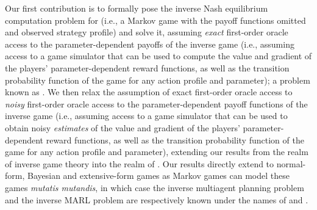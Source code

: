  
\fi

Our first contribution is to formally pose the inverse  Nash equilibrium computation problem for  (i.e., a Markov game with the payoff functions omitted and observed strategy profile) and solve it, assuming \emph{exact} first-order oracle access to the parameter-dependent payoffs of the inverse game (i.e., assuming access to a game simulator that can be used to compute the value and gradient of the players' parameter-dependent reward functions, as well as the transition probability function of the game for any action profile and parameter); a problem known as .
%
We then relax the assumption of exact first-order oracle access to \emph{noisy} first-order oracle access to the parameter-dependent payoff functions of the inverse game (i.e., assuming access to a game simulator that can be used to obtain noisy \emph{estimates\/} of the value and gradient of the players' parameter-dependent reward functions, as well as the transition probability function of the game for any action profile and parameter), extending our results from the realm of inverse game theory into the realm of  \citep{russell1998learning, ng2000algorithms,natarajan2010multi}. Our results directly extend to normal-form, Bayesian and extensive-form games as Markov games can model these games \emph{mutatis mutandis}, in which case the inverse multiagent planning problem and the inverse MARL problem are respectively known under the names of  and .
